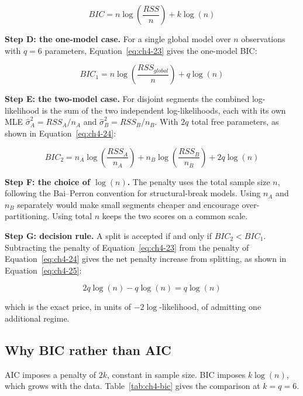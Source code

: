 \begin{equation}
    \label{eq:ch4-22}
BIC = n\log\!\left(\frac{RSS}{n}\right) + k\log(n)
\end{equation}

\textbf{Step D: the one-model case.} For a single global model over $n$ observations with
$q = 6$ parameters, Equation~\eqref{eq:ch4-23} gives the one-model BIC:

\begin{equation}
    \label{eq:ch4-23}
BIC_1 = n\log\!\left(\frac{RSS_{global}}{n}\right) + q\log(n)
\end{equation}

\textbf{Step E: the two-model case.} For disjoint segments the combined log-likelihood is
the sum of the two independent log-likelihoods, each with its own MLE
$\hat\sigma_A^2 = RSS_A/n_A$ and $\hat\sigma_B^2 = RSS_B/n_B$. With $2q$ total free
parameters, as shown in Equation~\eqref{eq:ch4-24}:

\begin{equation}
    \label{eq:ch4-24}
BIC_2 = n_A\log\!\left(\frac{RSS_A}{n_A}\right) + n_B\log\!\left(\frac{RSS_B}{n_B}\right) + 2q\log(n)
\end{equation}

\textbf{Step F: the choice of $\log(n)$.} The penalty uses the total sample size $n$,
following the Bai--Perron convention for structural-break models. Using $n_A$ and
$n_B$ separately would make small segments cheaper and encourage over-partitioning.
Using total $n$ keeps the two scores on a common scale.

\textbf{Step G: decision rule.} A split is accepted if and only if $BIC_2 < BIC_1$.
Subtracting the penalty of Equation~\eqref{eq:ch4-23} from the penalty of
Equation~\eqref{eq:ch4-24} gives the net penalty
increase from splitting, as shown in Equation~\eqref{eq:ch4-25}:

\begin{equation}
    \label{eq:ch4-25}
2q\log(n) - q\log(n) = q\log(n)
\end{equation}

which is the exact price, in units of $-2\log$-likelihood, of admitting one additional
regime.


\subsection{Why BIC rather than AIC}

AIC imposes a penalty of $2k$, constant in sample size. BIC imposes $k\log(n)$, which
grows with the data. Table~\ref{tab:ch4-bic} gives the comparison at $k = q = 6$.



